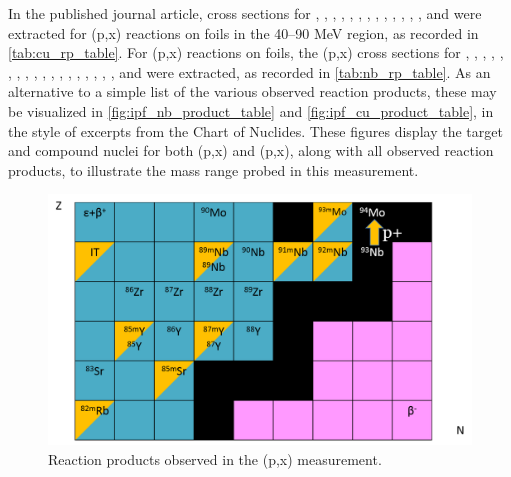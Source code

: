 In the published journal article, cross sections for  ,  , , , , , , ,  , , , , , and  were extracted for (p,x) reactions  on  foils in the 40--90 MeV region, as recorded in \autoref{tab:cu_rp_table}.
For  (p,x) reactions on  foils, the (p,x) cross sections for , , , , , , , , , , , , , , , , , , and  were extracted, as recorded in \autoref{tab:nb_rp_table}.
As an alternative to a simple list of the various observed reaction products, these may be visualized in \autoref{fig:ipf_nb_product_table} and \autoref{fig:ipf_cu_product_table}, in the style of excerpts from the Chart of  Nuclides.
These figures display the target and compound nuclei  for both  (p,x) and (p,x), along with all observed reaction products, to illustrate the mass range probed in this measurement. 



\begin{figure}
 \centering
 \includegraphics[width=0.75\columnwidth]{./figures/ipf_nb_product_table.png}
 \caption{Reaction products observed in the (p,x) measurement. }
 \label{fig:fe_nb_product_table}
\end{figure}


